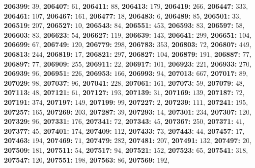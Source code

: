 \textsf{\bfseries 206399:} $39$, \textsf{\bfseries 206407:} $61$, \textsf{\bfseries 206411:} $88$, \textsf{\bfseries 206413:} $179$, \textsf{\bfseries 206419:} $266$, \textsf{\bfseries 206447:} $333$, \textsf{\bfseries 206461:} $107$, \textsf{\bfseries 206467:} $161$, \textsf{\bfseries 206477:} $18$, \textsf{\bfseries 206483:} $6$, \textsf{\bfseries 206489:} $85$, \textsf{\bfseries 206501:} $33$, \textsf{\bfseries 206519:} $207$, \textsf{\bfseries 206527:} $10$, \textsf{\bfseries 206543:} $84$, \textsf{\bfseries 206551:} $453$, \textsf{\bfseries 206593:} $83$, \textsf{\bfseries 206597:} $58$, \textsf{\bfseries 206603:} $83$, \textsf{\bfseries 206623:} $54$, \textsf{\bfseries 206627:} $119$, \textsf{\bfseries 206639:} $143$, \textsf{\bfseries 206641:} $299$, \textsf{\bfseries 206651:} $104$, \textsf{\bfseries 206699:} $67$, \textsf{\bfseries 206749:} $120$, \textsf{\bfseries 206779:} $298$, \textsf{\bfseries 206783:} $353$, \textsf{\bfseries 206803:} $72$, \textsf{\bfseries 206807:} $449$, \textsf{\bfseries 206813:} $244$, \textsf{\bfseries 206819:} $17$, \textsf{\bfseries 206821:} $297$, \textsf{\bfseries 206827:} $104$, \textsf{\bfseries 206879:} $191$, \textsf{\bfseries 206887:} $77$, \textsf{\bfseries 206897:} $77$, \textsf{\bfseries 206909:} $255$, \textsf{\bfseries 206911:} $22$, \textsf{\bfseries 206917:} $101$, \textsf{\bfseries 206923:} $221$, \textsf{\bfseries 206933:} $270$, \textsf{\bfseries 206939:} $96$, \textsf{\bfseries 206951:} $226$, \textsf{\bfseries 206953:} $166$, \textsf{\bfseries 206993:} $94$, \textsf{\bfseries 207013:} $667$, \textsf{\bfseries 207017:} $89$, \textsf{\bfseries 207029:} $98$, \textsf{\bfseries 207037:} $96$, \textsf{\bfseries 207041:} $228$, \textsf{\bfseries 207061:} $161$, \textsf{\bfseries 207073:} $59$, \textsf{\bfseries 207079:} $48$, \textsf{\bfseries 207113:} $48$, \textsf{\bfseries 207121:} $61$, \textsf{\bfseries 207127:} $193$, \textsf{\bfseries 207139:} $31$, \textsf{\bfseries 207169:} $139$, \textsf{\bfseries 207187:} $72$, \textsf{\bfseries 207191:} $374$, \textsf{\bfseries 207197:} $149$, \textsf{\bfseries 207199:} $99$, \textsf{\bfseries 207227:} $2$, \textsf{\bfseries 207239:} $111$, \textsf{\bfseries 207241:} $195$, \textsf{\bfseries 207257:} $165$, \textsf{\bfseries 207269:} $203$, \textsf{\bfseries 207287:} $39$, \textsf{\bfseries 207293:} $14$, \textsf{\bfseries 207301:} $234$, \textsf{\bfseries 207307:} $120$, \textsf{\bfseries 207329:} $96$, \textsf{\bfseries 207331:} $176$, \textsf{\bfseries 207341:} $72$, \textsf{\bfseries 207343:} $45$, \textsf{\bfseries 207367:} $250$, \textsf{\bfseries 207371:} $41$, \textsf{\bfseries 207377:} $45$, \textsf{\bfseries 207401:} $174$, \textsf{\bfseries 207409:} $112$, \textsf{\bfseries 207433:} $73$, \textsf{\bfseries 207443:} $44$, \textsf{\bfseries 207457:} $17$, \textsf{\bfseries 207463:} $194$, \textsf{\bfseries 207469:} $71$, \textsf{\bfseries 207479:} $282$, \textsf{\bfseries 207481:} $207$, \textsf{\bfseries 207491:} $132$, \textsf{\bfseries 207497:} $20$, \textsf{\bfseries 207509:} $181$, \textsf{\bfseries 207511:} $54$, \textsf{\bfseries 207517:} $94$, \textsf{\bfseries 207521:} $152$, \textsf{\bfseries 207523:} $65$, \textsf{\bfseries 207541:} $318$, \textsf{\bfseries 207547:} $120$, \textsf{\bfseries 207551:} $198$, \textsf{\bfseries 207563:} $86$, \textsf{\bfseries 207569:} $192$, 
